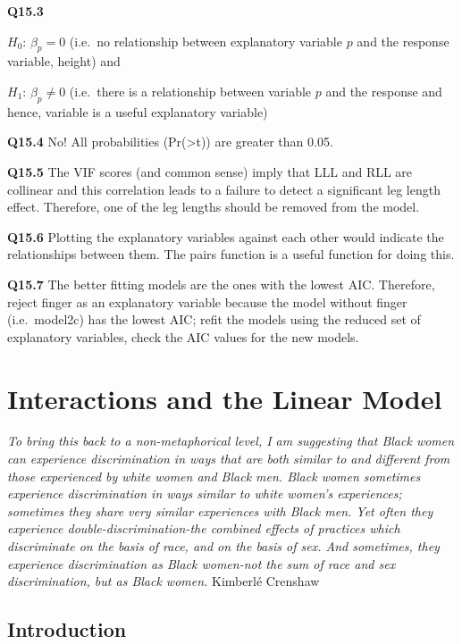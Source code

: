 \documentclass[
  oneside]{krantz}
\begin{document}
\textbf{Q15.3}\\
\raggedright
\(H_{0}\): \({\beta{}}_p=0\) (i.e.~no relationship between explanatory variable \(p\) and the response variable, height) and
\raggedright
\(H_{1}\): \({\beta{}}_p\not=0\) (i.e.~there is a relationship between variable \(p\) and the response and hence, variable is a useful explanatory variable)

\textbf{Q15.4} No! All probabilities (Pr(\textgreater\textbar t\textbar)) are greater than 0.05.

\textbf{Q15.5} The VIF scores (and common sense) imply that LLL and RLL are collinear and this correlation leads to a failure to detect a significant leg length effect. Therefore, one of the leg lengths should be removed from the model.

\textbf{Q15.6} Plotting the explanatory variables against each other would indicate the relationships between them. The pairs function is a useful function for doing this.

\textbf{Q15.7} The better fitting models are the ones with the lowest AIC. Therefore, reject finger as an explanatory variable because the model without finger (i.e.~model2c) has the lowest AIC; refit the models using the reduced set of explanatory variables, check the AIC values for the new models.

\hypertarget{interac}{%
\chapter{Interactions and the Linear Model}\label{interac}}

\emph{To bring this back to a non-metaphorical level, I am suggesting that Black women can experience discrimination in ways that are both similar to and different from those experienced by
white women and Black men. Black women sometimes experience discrimination in ways similar to white women's experiences; sometimes they share very similar experiences with Black men. Yet
often they experience double-discrimination-the combined effects of practices which discriminate on the basis of race, and on the basis of sex. And sometimes, they experience discrimination as
Black women-not the sum of race and sex discrimination, but as Black women.}
Kimberlé Crenshaw \citeyearpar{Crenshaw1989}

\hypertarget{INTinterac}{%
\section{Introduction}\label{INTinterac}}
\end{document}
